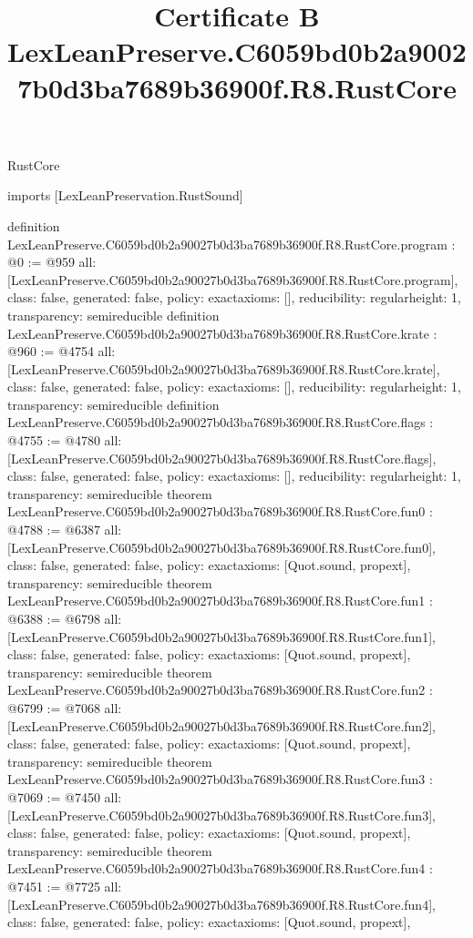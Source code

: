 \begin{lexlean}{RustCore}
\title{Certificate B LexLeanPreserve.C6059bd0b2a90027b0d3ba7689b36900f.R8.RustCore}
\begin{coremodule}
imports [LexLeanPreservation.RustSound]

definition LexLeanPreserve.C6059bd0b2a90027b0d3ba7689b36900f.R8.RustCore.program : @0 := @959 {
  all: [LexLeanPreserve.C6059bd0b2a90027b0d3ba7689b36900f.R8.RustCore.program],
  class: false,
  generated: false,
  policy: exact{axioms: []},
  reducibility: regular{height: 1},
  transparency: semireducible
}
definition LexLeanPreserve.C6059bd0b2a90027b0d3ba7689b36900f.R8.RustCore.krate : @960 := @4754 {
  all: [LexLeanPreserve.C6059bd0b2a90027b0d3ba7689b36900f.R8.RustCore.krate],
  class: false,
  generated: false,
  policy: exact{axioms: []},
  reducibility: regular{height: 1},
  transparency: semireducible
}
definition LexLeanPreserve.C6059bd0b2a90027b0d3ba7689b36900f.R8.RustCore.flags : @4755 := @4780 {
  all: [LexLeanPreserve.C6059bd0b2a90027b0d3ba7689b36900f.R8.RustCore.flags],
  class: false,
  generated: false,
  policy: exact{axioms: []},
  reducibility: regular{height: 1},
  transparency: semireducible
}
theorem LexLeanPreserve.C6059bd0b2a90027b0d3ba7689b36900f.R8.RustCore.fun0 : @4788 := @6387 {
  all: [LexLeanPreserve.C6059bd0b2a90027b0d3ba7689b36900f.R8.RustCore.fun0],
  class: false,
  generated: false,
  policy: exact{axioms: [Quot.sound, propext]},
  transparency: semireducible
}
theorem LexLeanPreserve.C6059bd0b2a90027b0d3ba7689b36900f.R8.RustCore.fun1 : @6388 := @6798 {
  all: [LexLeanPreserve.C6059bd0b2a90027b0d3ba7689b36900f.R8.RustCore.fun1],
  class: false,
  generated: false,
  policy: exact{axioms: [Quot.sound, propext]},
  transparency: semireducible
}
theorem LexLeanPreserve.C6059bd0b2a90027b0d3ba7689b36900f.R8.RustCore.fun2 : @6799 := @7068 {
  all: [LexLeanPreserve.C6059bd0b2a90027b0d3ba7689b36900f.R8.RustCore.fun2],
  class: false,
  generated: false,
  policy: exact{axioms: [Quot.sound, propext]},
  transparency: semireducible
}
theorem LexLeanPreserve.C6059bd0b2a90027b0d3ba7689b36900f.R8.RustCore.fun3 : @7069 := @7450 {
  all: [LexLeanPreserve.C6059bd0b2a90027b0d3ba7689b36900f.R8.RustCore.fun3],
  class: false,
  generated: false,
  policy: exact{axioms: [Quot.sound, propext]},
  transparency: semireducible
}
theorem LexLeanPreserve.C6059bd0b2a90027b0d3ba7689b36900f.R8.RustCore.fun4 : @7451 := @7725 {
  all: [LexLeanPreserve.C6059bd0b2a90027b0d3ba7689b36900f.R8.RustCore.fun4],
  class: false,
  generated: false,
  policy: exact{axioms: [Quot.sound, propext]},
}
\end{coremodule}
\end{lexlean}
